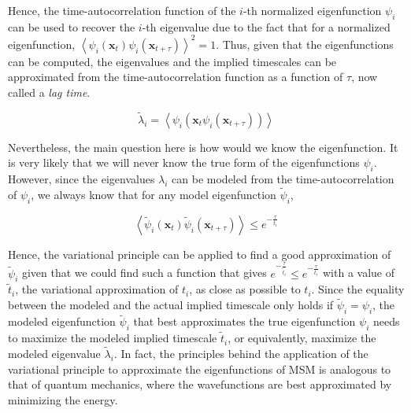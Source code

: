 \begin{spacing}{2.0}
    Hence, the time-autocorrelation function of the $i$-th normalized eigenfunction $\psi_i$ can be used to recover the $i$-th eigenvalue due
    to the fact that for a normalized eigenfunction, $\left<\psi_i(\mathbf{x}_t)\psi_i(\mathbf{x}_{t+\tau})\right>^2 = 1$. Thus, given that the 
    eigenfunctions can be computed, the eigenvalues and the implied timescales can be approximated from the time-autocorrelation function as a 
    function of $\tau$, now called a \textsl{lag time}.

    \begin{equation}
        \tilde{\lambda}_i = \left<\psi_i(\mathbf{x}_t\psi_i(\mathbf{x}_{t+\tau}))\right>
    \end{equation}

    Nevertheless, the main question here is how would we know the eigenfunction. It is very likely that we will never know the true form of the 
    eigenfunctions $\psi_i$. However, since the eigenvalues $\lambda_i$ can be modeled from the time-autocorrelation of $\psi_i$, we always know 
    that for any model eigenfunction $\tilde{\psi}_i$,

    \begin{equation}
        \left<\tilde{\psi}_i(\mathbf{x}_t)\tilde{\psi}_i(\mathbf{x}_{t+\tau})\right> \leq e^{-\frac{\tau}{t_i}}
    \end{equation}

    Hence, the variational principle can be applied to find a good approximation of $\tilde{\psi}_i$ given that we could find such a function that 
    gives $e^{-\frac{\tau}{\tilde{t}_i}} \leq e^{-\frac{\tau}{t_i}}$ with a value of $\tilde{t}_i$, the variational approximation of $t_i$, as close 
    as possible to $t_i$. Since the equality between the modeled and the actual implied timescale only holds if $\tilde{\psi}_i = \psi_i$,
    the modeled eigenfunction $\tilde{\psi}_i$ that best approximates the true eigenfunction $\psi_i$ needs to maximize the modeled implied timescale
    $\tilde{t}_i$, or equivalently, maximize the modeled eigenvalue $\tilde{\lambda}_i$. In fact, the principles behind the application of the 
    variational principle to approximate the eigenfunctions of MSM is analogous to that of quantum mechanics, where the wavefunctions are best 
    approximated by minimizing the energy.
\end{spacing}
